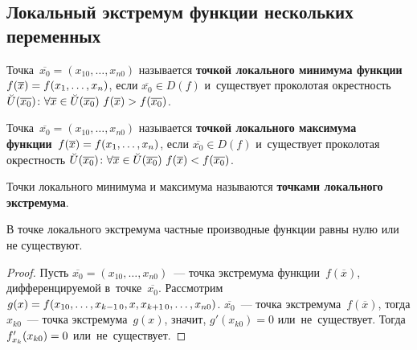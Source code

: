 \subsection{Локальный экстремум функции нескольких переменных}
Точка~$\overline{x_0} = (x_{10}, \ldots, x_{n0})$ называется \textbf{точкой локального минимума функции}~$f(\overline x) \opbr= f(x_1, \ldots, \allowbreak x_n)$,
если $\overline{x_0} \in D(f)$ и~существует проколотая окрестность
$\breve U(\overline{x_0}) \colon
\forall \overline x \in \breve U(\overline{x_0}) \ \allowbreak
f(\overline x) \opbr> f(\overline{x_0})$.
	
Точка~$\overline{x_0} = (x_{10}, \ldots, x_{n0})$ называется \textbf{точкой локального максимума функции}~$f(\overline x) \opbr= f(x_1, \ldots, \allowbreak x_n)$,
если $\overline{x_0} \in D(f)$ и~существует проколотая окрестность
$\breve U(\overline{x_0}) \colon
\forall \overline x \in \breve U(\overline{x_0}) \ \allowbreak
f(\overline x) \opbr< f(\overline{x_0})$.

Точки локального минимума и максимума называются \textbf{точками локального экстремума}.
	
\begin{theorem}
В точке локального экстремума частные производные функции равны нулю или не существуют.
\end{theorem}
\begin{proof}
Пусть $\overline{x_0} = (x_{10}, \ldots, x_{n0})$~--- точка экстремума функции~$f(\overline x)$, дифференцируемой в~точке~$\overline{x_0}$.
Рассмотрим
$g(x) \opbr= f(x_{10}, \ldots, \allowbreak x_{k-1\,0}, x, x_{k+1\,0}, \ldots, \allowbreak x_{n0})$.
$\overline{x_0}$~--- точка экстремума~$f(\overline x)$, тогда $x_{k0}$~--- точка экстремума~$g(x)$, значит, $g'(x_{k0}) = 0$ или~не~существует.
Тогда $f_{x_k}'(x_{k0}) \opbr= 0$ или~не~существует.
\end{proof}

